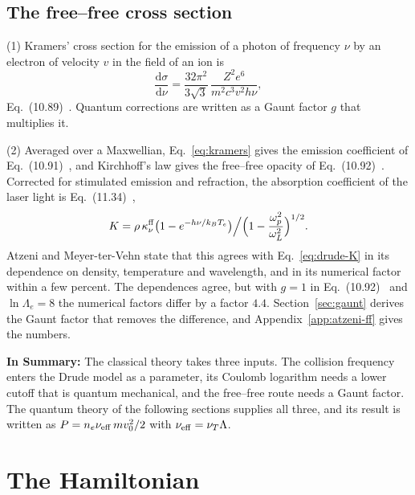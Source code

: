 \documentclass[11pt]{article}
\numberwithin{equation}{section}
\newcommand{\nuT}{\nu_T}
\newcommand{\nueff}{\nu_{\rm eff}}
\newcommand{\dd}{\mathrm d}
\newcommand{\kB}{k_B}
\begin{document}
\subsection{The free--free cross section}
\label{sec:kramers}
{\noindent}(1) Kramers' cross section for the emission of a photon of
frequency $\nu$ by an electron of velocity $v$ in the field of an ion is
\cite{Kramers1923}
\begin{equation}
\frac{\dd\sigma}{\dd\nu}=\frac{32\pi^2}{3\sqrt3}\,\frac{Z^2e^6}{m^2c^3v^2h\nu},
\label{eq:kramers}
\end{equation}
Eq.~(10.89)~\cite{Atzeni2004}. Quantum corrections are written as a Gaunt
factor $g$ that multiplies it.

{\noindent}(2) Averaged over a Maxwellian, Eq.~\eqref{eq:kramers} gives the
emission coefficient of Eq.~(10.91)~\cite{Atzeni2004}, and Kirchhoff's law
gives the free--free opacity of Eq.~(10.92)~\cite{Atzeni2004}. Corrected for
stimulated emission and refraction, the absorption coefficient of the laser
light is Eq.~(11.34)~\cite{Atzeni2004},
\begin{equation}
K=\rho\,\kappa^{\rm ff}_\nu\big(1-e^{-h\nu/\kB T_e}\big)\Big/\Big(1-\frac{\omega_p^2}{\omega_L^2}\Big)^{1/2}.
\label{eq:atz-1134}
\end{equation}
Atzeni and Meyer-ter-Vehn state that this agrees with
Eq.~\eqref{eq:drude-K} in its dependence on density, temperature and
wavelength, and in its numerical factor within a few percent. The dependences
agree, but with $g=1$ in Eq.~(10.92)~\cite{Atzeni2004} and $\ln\Lambda_e=8$ the
numerical factors differ by a factor $4.4$. Section~\ref{sec:gaunt} derives
the Gaunt factor that removes the difference, and
Appendix~\ref{app:atzeni-ff} gives the numbers.

\medskip
\noindent\textbf{In Summary:} The classical theory takes three inputs. The
collision frequency enters the Drude model as a parameter, its Coulomb
logarithm needs a lower cutoff that is quantum mechanical, and the free--free
route needs a Gaunt factor. The quantum theory of the following sections
supplies all three, and its result is written as
$P=n_e\nueff\,mv_0^2/2$ with $\nueff=\nuT\Lambda$.

\section{The Hamiltonian}
\label{sec:hamiltonian}
\end{document}
